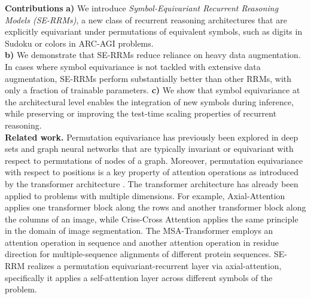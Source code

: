 \documentclass{article}
\theoremstyle{plain}
\theoremstyle{definition}
\theoremstyle{remark}
\renewcommand{\paragraph}[1]{\textbf{#1}\;}
\begin{document}
\paragraph{Contributions}
    \textbf{a)} We introduce \emph{Symbol-Equivariant Recurrent Reasoning Models (SE-RRMs)}, a new class of recurrent reasoning architectures that are explicitly equivariant under permutations of equivalent symbols, such as digits in Sudoku or colors in ARC-AGI problems. \\
    \textbf{b)} We demonstrate that SE-RRMs reduce reliance on heavy data augmentation. In cases where symbol equivariance is not tackled with extensive data augmentation, SE-RRMs perform substantially better than other RRMs, with only a fraction of trainable parameters. 
    \textbf{c)} We show that symbol equivariance at the architectural level enables the integration of new symbols during inference, while preserving or improving the test-time scaling properties of recurrent reasoning.\\

\paragraph{Related work.} Permutation equivariance has previously been explored in deep sets \citep{deepsets} and graph neural networks \citep{scarselli2008graph, kipf2016semi, defferrard2016convolutional, gilmer2017neural} that are typically invariant or equivariant with respect to permutations of nodes of a graph. Moreover, permutation equivariance with respect to positions is a key property of attention operations as introduced by the transformer architecture \citep{vaswani2017attention}. %
The transformer architecture has already been applied to problems with multiple dimensions. For example, Axial-Attention \citep{ho2019axial} applies one transformer block along the rows and another transformer block along the columns of an image, while Criss-Cross Attention \citep{huang2019ccnet} applies the same principle in the domain of image segmentation. The MSA-Transformer \citep{rao2021msa} employs an attention operation in sequence and another attention operation in residue direction for multiple-sequence alignments of different protein sequences. 
SE-RRM realizes a permutation equivariant-recurrent layer via axial-attention, specifically it applies a self-attention layer across different symbols of the problem.
\end{document}
